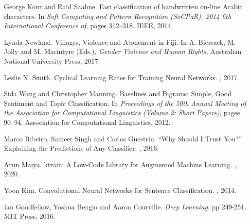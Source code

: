 \documentclass[twocolumn,10pt]{wmrDoc}
\begin{document}
\begin{thebibliography}{1}
George Kour and Raid Saabne.
\newblock Fast classification of handwritten on-line Arabic characters.
\newblock In {\em Soft Computing and Pattern Recognition (SoCPaR), 2014 6th
  International Conference of}, pages 312--318. IEEE, 2014.

Lynda Newland.
\newblock Villages, Violence and Atonement in Fiji.
\newblock In A. Biersack, M. Jolly and M. Macintyre (Eds.), {\em Gender Violence and Human Rights}, Australian National University Press, 2017.

Leslie N. Smith.
\newblock Cyclical Learning Rates for Training Neural Networks.
, 2017.

Sida Wang and Christopher Manning.
\newblock Baselines and Bigrams: Simple, Good Sentiment and Topic Classification.
\newblock In {\em Proceedings of the 50th Annual Meeting of the Association for Computational Linguistics (Volume 2: Short Papers)}, pages 90--94. Association for Computational Linguistics, 2012.

Marco Ribeiro, Sameer Singh and Carlos Guestrin.
\newblock “Why Should I Trust You?” Explaining the Predictions of Any Classifier.
, 2016.

Arun Maiya.
\newblock ktrain: A Low-Code Library for Augmented Machine Learning.
, 2020.

Yoon Kim.
\newblock Convolutional Neural Networks for Sentence Classification.
, 2014.

Ian Goodfellow, Yoshua Bengio and Aaron Courville.
\newblock \emph{Deep Learning}.
\newblock pp 249-251. MIT Press, 2016.

\end{thebibliography}
\end{document}

